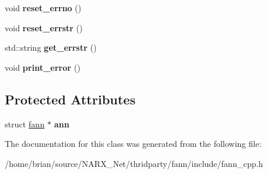 \begin{DoxyCompactItemize}
\item 
\hypertarget{class_f_a_n_n_1_1neural__net_ab40db30df0e46460c1881b59bced410b}{void {\bfseries reset\-\_\-errno} ()}\label{class_f_a_n_n_1_1neural__net_ab40db30df0e46460c1881b59bced410b}

\item 
\hypertarget{class_f_a_n_n_1_1neural__net_a3b05f5c87a6f5c5d0183b7af635df328}{void {\bfseries reset\-\_\-errstr} ()}\label{class_f_a_n_n_1_1neural__net_a3b05f5c87a6f5c5d0183b7af635df328}

\item 
\hypertarget{class_f_a_n_n_1_1neural__net_a972fdcc73ebf2eaf1e08150d111657f3}{std\-::string {\bfseries get\-\_\-errstr} ()}\label{class_f_a_n_n_1_1neural__net_a972fdcc73ebf2eaf1e08150d111657f3}

\item 
\hypertarget{class_f_a_n_n_1_1neural__net_a9a730e84612c38a637f04bf983e4f0b4}{void {\bfseries print\-\_\-error} ()}\label{class_f_a_n_n_1_1neural__net_a9a730e84612c38a637f04bf983e4f0b4}

\end{DoxyCompactItemize}
\subsection*{Protected Attributes}
\begin{DoxyCompactItemize}
\item 
\hypertarget{class_f_a_n_n_1_1neural__net_a60ab18d51ec4e596492b753d4d6d2ebf}{struct \hyperlink{structfann}{fann} $\ast$ {\bfseries ann}}\label{class_f_a_n_n_1_1neural__net_a60ab18d51ec4e596492b753d4d6d2ebf}

\end{DoxyCompactItemize}


The documentation for this class was generated from the following file\-:\begin{DoxyCompactItemize}
\item 
/home/brian/source/\-N\-A\-R\-X\-\_\-\-Net/thridparty/fann/include/fann\-\_\-cpp.\-h\end{DoxyCompactItemize}
